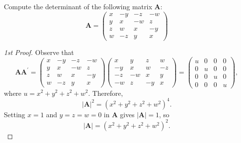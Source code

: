 \documentclass[12pt, a4paper, oneside]{book}
\begin{document}
\begin{question}
    Compute the determinant of the following matrix $\mathbf{A}$:
    \[
        \mathbf{A}
        =
        \left(
        \begin{array}{cccc}
                x & -y & -z & -w \\
                y & x  & -w & z  \\
                z & w  & x  & -y \\
                w & -z & y  & x
            \end{array}
        \right)
    \]
    \begin{proof}[1st Proof]
        Observe that
        \[
            \mathbf{A} \mathbf{A}^{\prime}=\left(\begin{array}{cccc}
                    x & -y & -z & -w \\
                    y & x  & -w & z  \\
                    z & w  & x  & -y \\
                    w & -z & y  & x
                \end{array}\right)\left(\begin{array}{cccc}
                    x  & y  & z  & w  \\
                    -y & x  & w  & -z \\
                    -z & -w & x  & y  \\
                    -w & z  & -y & x
                \end{array}\right)=\left(\begin{array}{cccc}
                    u & 0 & 0 & 0 \\
                    0 & u & 0 & 0 \\
                    0 & 0 & u & 0 \\
                    0 & 0 & 0 & u
                \end{array}\right),
        \]
        where $u=x^2+y^2+z^2+w^2$. Therefore,
        \[
            |\mathbf{A}|^2=\left(x^2+y^2+z^2+w^2\right)^4 .
        \]
        Setting $x=1$ and $y=z=w=0$ in $\mathbf{A}$ gives $|\mathbf{A}|=1$, so
        \[
            |\mathbf{A}|=\left(x^2+y^2+z^2+w^2\right)^2 .
        \]



\end{proof}
\end{question}
\end{document}
